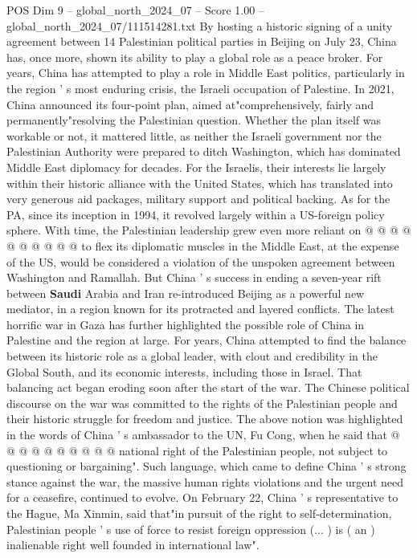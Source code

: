 \begin{textsample}{POS Dim 9 – global\_north\_2024\_07 – Score 1.00 – global\_north\_2024\_07/111514281.txt}  \label{ex:f9_pos_291}
By hosting a historic signing of a unity agreement between 14 Palestinian political parties in Beijing on July 23, China has, once more, shown its ability to play a global role as a peace broker.
For years, China has attempted to play a role in Middle East politics, particularly in the region ' s most enduring crisis, the Israeli occupation of Palestine.
In 2021, China announced its four-point plan, aimed at"comprehensively, fairly and permanently"resolving the Palestinian question.
Whether the plan itself was workable or not, it mattered little, as neither the Israeli government nor the Palestinian Authority were prepared to ditch Washington, which has dominated Middle East diplomacy for decades.
For the Israelis, their interests lie largely within their historic alliance with the United States, which has translated into very generous aid packages, military support and political backing.
As for the PA, since its inception in 1994, it revolved largely within a US-foreign policy sphere.
With time, the Palestinian leadership grew even more reliant on @ @ @ @ @ @ @ @ @ @ to flex its diplomatic muscles in the Middle East, at the expense of the US, would be considered a violation of the unspoken agreement between Washington and Ramallah.
But China ' s success in ending a seven-year rift between \textbf{Saudi} Arabia and Iran re-introduced Beijing as a powerful new mediator, in a region known for its protracted and layered conflicts.
The latest horrific war in Gaza has further highlighted the possible role of China in Palestine and the region at large.
For years, China attempted to find the balance between its historic role as a global leader, with clout and credibility in the Global South, and its economic interests, including those in Israel.
That balancing act began eroding soon after the start of the war.
The Chinese political discourse on the war was committed to the rights of the Palestinian people and their historic struggle for freedom and justice.
The above notion was highlighted in the words of China ' s ambassador to the UN, Fu Cong, when he said that @ @ @ @ @ @ @ @ @ @ national right of the Palestinian people, not subject to questioning or bargaining".
Such language, which came to define China ' s strong stance against the war, the massive human rights violations and the urgent need for a ceasefire, continued to evolve.
On February 22, China ' s representative to the Hague, Ma Xinmin, said that"in pursuit of the right to self-determination, Palestinian people ' s use of force to resist foreign oppression (... ) is ( an ) inalienable right well founded in international law".

\end{textsample}
